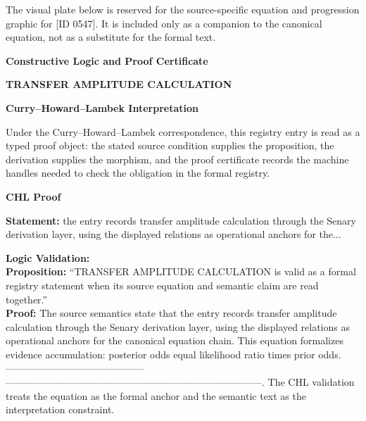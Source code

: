 \begingroup\footnotesize\sloppy
The visual plate below is reserved for the source-specific equation and progression graphic for [ID 0547]. It is included only as a companion to the canonical equation, not as a substitute for the formal text.
\par\endgroup
\ifTZPDarkEdition
{}
\fi

\clearpage
\begingroup\tzpsupportsetup
\noindent\textbf{\fontsize{10.8pt}{12.8pt}\selectfont [ID 0547] Constructive Logic and Proof Certificate}\par
\noindent\textbf{\fontsize{10pt}{12pt}\selectfont TRANSFER AMPLITUDE CALCULATION}\par
\vspace{0.45em}
\begingroup
\footnotesize
\setlength{\parskip}{0.22em}
\setlength{\parindent}{0pt}
\noindent\textbf{Curry--Howard--Lambek Interpretation}\par
Under the Curry--Howard--Lambek correspondence, this registry entry is read as a typed proof
object: the stated source condition supplies the proposition, the derivation supplies the
morphism, and the proof certificate records the machine handles needed to check the obligation
in the formal registry.

\vspace{0.45em}
\noindent\textbf{CHL Proof}\par
\textbf{Statement:} the entry records transfer amplitude calculation through the Senary derivation layer,
using the displayed relations as operational anchors for the...

\textbf{Logic Validation:}\\
\textbf{Proposition:} ``TRANSFER AMPLITUDE CALCULATION is valid as a formal registry statement when its source
equation and semantic claim are read together.''\\
\textbf{Proof:} The source semantics state that the entry records transfer amplitude calculation through
the Senary derivation layer, using the displayed relations as operational anchors for
the canonical equation chain. This equation formalizes evidence accumulation: posterior
odds equal likelihood ratio times prior odds. ------------------------------------------
------------------------------------------------------------------------------. The CHL
validation treats the equation as the formal anchor and the semantic text as the
interpretation constraint.

